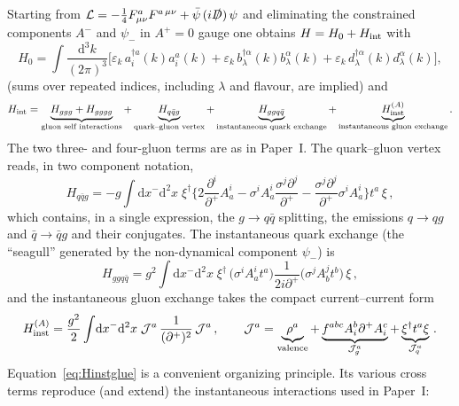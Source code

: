 \documentclass[11pt]{article}
\newcommand{\eps}{\varepsilon}
\newcommand{\dd}{\mathrm{d}}
\newcommand{\ip}[1]{\int\!\frac{\dd^3 #1}{(2\pi)^3}}
\newcommand{\dg}{\dagger}
\newcommand{\Hqqg}{H_{q\bar q g}}
\newcommand{\Hggqq}{H_{ggq\bar q}}
\newcommand{\Hggg}{H_{ggg}}
\newcommand{\Hgggg}{H_{gggg}}
\begin{document}
Starting from
$\mathcal L=-\tfrac14 F^a_{\mu\nu}F^{a\,\mu\nu}+\bar\psi\,(i\slashed D)\,\psi$ and eliminating the
constrained components $A^-$ and $\psi_-$ in $A^+=0$ gauge one obtains
$H=H_0+H_{\rm int}$ with
\begin{equation}
H_0=\ip{k}\Big[\eps_k\,a^{\dg a}_i(k)a^a_i(k)
+\eps_k\,b^{\dg\alpha}_\lambda(k)b^\alpha_\lambda(k)
+\eps_k\,d^{\dg\alpha}_\lambda(k)d^\alpha_\lambda(k)\Big],
\end{equation}
(sums over repeated indices, including $\lambda$ and flavour, are implied) and
\begin{equation}
H_{\rm int}=\underbrace{\Hggg+\Hgggg}_{\text{gluon self interactions}}
+\underbrace{\Hqqg}_{\text{quark--gluon vertex}}
+\underbrace{\Hggqq}_{\text{instantaneous quark exchange}}
+\underbrace{H^{(A)}_{\rm inst}}_{\text{instantaneous gluon exchange}} .
\label{eq:Hint}
\end{equation}
The two three- and four-gluon terms are as in Paper~I. The quark--gluon vertex reads, in two
component notation,
\begin{equation}
\Hqqg=-g\!\int\!\dd x^-\dd^2x\;
\xi^\dg\Big\{2\frac{\partial^i}{\partial^+}A^i_a
-\sigma^iA^i_a\frac{\sigma^j\partial^j}{\partial^+}
-\frac{\sigma^j\partial^j}{\partial^+}\sigma^iA^i_a\Big\}t^a\,\xi\,,
\label{eq:Hqqg}
\end{equation}
which contains, in a single expression, the $g\to q\bar q$ splitting, the emissions $q\to qg$ and
$\bar q\to\bar q g$ and their conjugates. The instantaneous quark exchange (the ``seagull''
generated by the non-dynamical component $\psi_-$) is
\begin{equation}
\Hggqq=g^2\!\int\!\dd x^-\dd^2 x\;
\xi^\dg\,\big(\sigma^iA^i_at^a\big)\frac{1}{2i\partial^+}\big(\sigma^jA^j_bt^b\big)\,\xi\,,
\label{eq:Hggqq}
\end{equation}
and the instantaneous gluon exchange takes the compact current--current form
\begin{equation}
H^{(A)}_{\rm inst}=\frac{g^2}{2}\int\!\dd x^-\dd^2x\;
\mathcal J^a\,\frac{1}{(\partial^+)^2}\,\mathcal J^a\,,\qquad
\mathcal J^a=\underbrace{\rho^a}_{\rm valence}
+\underbrace{f^{abc}A^b_i\partial^+A^c_i}_{\mathcal J^a_g}
+\underbrace{\xi^\dg t^a\xi}_{\mathcal J^a_q}\,.
\label{eq:Hinstglue}
\end{equation}
Equation~\eqref{eq:Hinstglue} is a convenient organizing principle. Its various cross terms
reproduce (and extend) the instantaneous interactions used in Paper~I:
\end{document}
